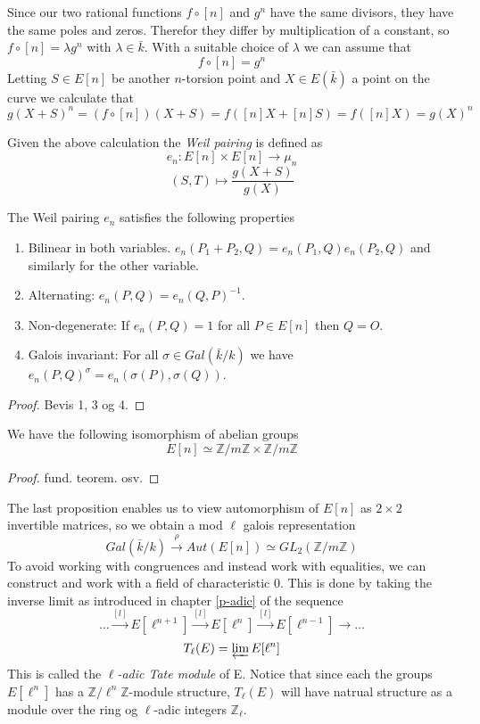Since our two rational functions $f \circ [n]$ and $g^n$ have the same divisors, they have the
same poles and zeros. Therefor they differ by multiplication of a constant, so
$f \circ [n] = \lambda g^n$ with $\lambda \in \bar{k}$. With a suitable choice of $\lambda$
we can assume that 
$$f \circ [n] = g^n$$
Letting $S \in E[n]$ be another $n$-torsion point and $X \in E(\bar{k})$ a point on the curve we calculate that
$$ g(X + S)^n = (f \circ [n])(X + S) = f([n]X + [n]S) = f([n]X) = g(X)^n $$
\begin{mydef}
 Given the above calculation the \emph{Weil pairing} is defined as
$$ e_n : E[n] \times E[n] \rightarrow \mu_n$$
$$ (S,T) \mapsto \frac{g(X + S)}{g(X)} $$
\end{mydef}

\begin{prop}
 The Weil pairing $e_n$ satisfies the following properties
\begin{enumerate}
 \item Bilinear in both variables. $e_n(P_1 + P_2, Q) = e_n(P_1,Q)e_n(P_2,Q)$ and similarly for the other variable.
 \item Alternating: $e_n(P,Q) = e_n(Q,P)^{-1}$.
 \item Non-degenerate: If $e_n(P,Q) = 1$ for all $P \in E[n]$ then $Q=O$.
 \item Galois invariant: For all $\sigma \in Gal(\bar{k}/k)$ we have $e_n(P,Q)^\sigma = e_n(\sigma(P),\sigma(Q))$.
\end{enumerate}
\end{prop}
\begin{proof}
 Bevis 1, 3 og 4.
\end{proof}

\begin{prop}
We have the following isomorphism of abelian groups
 $$ E[n] \simeq \mathbb{Z}/m\mathbb{Z} \times \mathbb{Z}/m\mathbb{Z} $$
\end{prop}
\begin{proof}
 fund. teorem. osv.
\end{proof}

The last proposition enables us to view automorphism of $E[n]$ as $2\times 2$ invertible matrices,
so we obtain a  mod $\ell$ galois representation
$$ Gal(\bar{k}/k) \overset{\rho}{\rightarrow} Aut(E[n]) \simeq GL_2(\mathbb{Z}/m\mathbb{Z}) $$
To avoid working with congruences and instead work with equalities, we can construct
and work with a field of characteristic 0. This is done by taking the inverse limit 
as introduced in chapter \ref{p-adic} of the sequence
$$ \dots \overset{[l]}{\rightarrow} E[\ell^{n+1}] \overset{[l]}{\rightarrow} E[\ell^{n}] \overset{[l]}{\rightarrow} E[\ell^{n-1}] \rightarrow \ldots $$
$$ T_\ell(E) = \varprojlim E[\ell^n] $$
This is called the \emph{$\ell$-adic Tate module} of E. Notice that since each the groups $E[\ell^n]$ has a
$\mathbb{Z}/\ell^n\mathbb{Z}$-module structure, $T_\ell(E)$ will have natrual structure as a module
over the ring og $\ell$-adic integers $\mathbb{Z}_\ell$.

